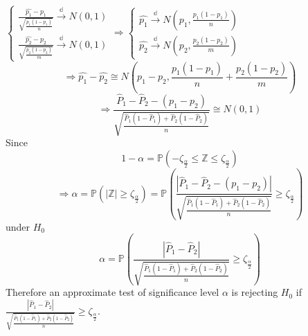 $\begin{cases}
\frac{\hat{p_1} - p_1}{\sqrt{\frac{p_1 (1-p_1)}{n}}} \overset{\mathbb{d}}{\to} N(0, 1) \\
\frac{\hat{p_2} - p_2}{\sqrt{\frac{p_2 (1-p_2)}{m}}} \overset{\mathbb{d}}{\to} N(0, 1)
\end{cases} \Rightarrow \begin{cases}
\hat{p_1} \overset{\mathbb{d}}{\to} N(p_1, \frac{p_1 (1-p_1)}{n}) \\
\hat{p_2} \overset{\mathbb{d}}{\to} N(p_2, \frac{p_2 (1-p_2)}{m})
\end{cases}$
$$\Rightarrow \hat{p_1}  - \hat{p_2} \cong N(p_1 - p_2, \frac{p_1 (1-p_1)}{n} + \frac{p_2 (1-p_2)}{m})$$
$$\Rightarrow \frac{\hat{P}_1 - \hat{P}_2 - (p_1 - p_2)}{\sqrt{\frac{\hat{P}_1(1-\hat{P}_1) + \hat{P}_2(1-\hat{P}_2)}{n}}} \cong N(0, 1)$$
Since
$$1-\alpha = \mathbb{P}(-\zeta_{\frac{\alpha}{2}} \leq \mathbb{Z} \leq \zeta_{\frac{\alpha}{2}})$$
$$\Rightarrow \alpha = \mathbb{P} (|\mathbb{Z}| \geq \zeta_{\frac{\alpha}{2}})
= \mathbb{P}(\frac{|\hat{P}_1 - \hat{P}_2 - (p_1 - p_2)|}{\sqrt{\frac{\hat{P}_1(1-\hat{P}_1) + \hat{P}_2(1-\hat{P}_2)}{n}}}\geq \zeta_{\frac{\alpha}{2}})$$
under $H_0$
$$ \alpha = \mathbb{P}(\frac{|\hat{P}_1 - \hat{P}_2|}{\sqrt{\frac{\hat{P}_1(1-\hat{P}_1) + \hat{P}_2(1-\hat{P}_2)}{n}}}\geq \zeta_{\frac{\alpha}{2}})$$
Therefore an approximate test of significance level $\alpha$ is rejecting $H_0$ if $\frac{|\hat{P}_1 - \hat{P}_2|}{\sqrt{\frac{\hat{P}_1(1-\hat{P}_1) + \hat{P}_2(1-\hat{P}_2)}{n}}}\geq \zeta_{\frac{\alpha}{2}}$.
